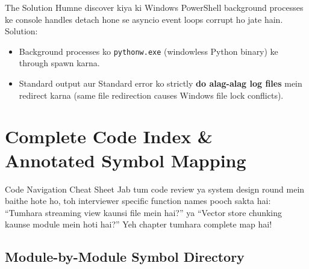 \documentclass[11pt,a4paper,twoside]{report}
\begin{document}
\begin{conceptbox}{The Solution}
Humne discover kiya ki Windows PowerShell background processes ke console handles detach hone se asyncio event loops corrupt ho jate hain.
Solution:
\begin{itemize}
    \item Background processes ko \texttt{pythonw.exe} (windowless Python binary) ke through spawn karna.
    \item Standard output aur Standard error ko strictly \textbf{do alag-alag log files} mein redirect karna (same file redirection causes Windows file lock conflicts).
\end{itemize}
\end{conceptbox}




\chapter{Complete Code Index \& Annotated Symbol Mapping}

\begin{storybox}{Code Navigation Cheat Sheet}
Jab tum code review ya system design round mein baithe hote ho, toh interviewer specific function names pooch sakta hai: ``Tumhara streaming view kaunsi file mein hai?'' ya ``Vector store chunking kaunse module mein hoti hai?''
Yeh chapter tumhara complete map hai!
\end{storybox}

\section{Module-by-Module Symbol Directory}
\end{document}
